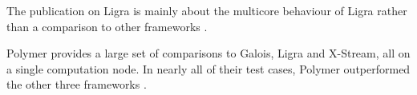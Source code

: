The publication on Ligra is mainly about the multicore behaviour of Ligra rather than a comparison to other frameworks \cite{Ligra}.

Polymer provides a large set of comparisons to Galois, Ligra and X-Stream, all on a single computation node. In nearly all of their test cases, Polymer outperformed the other three frameworks \cite{Polymer}. 


